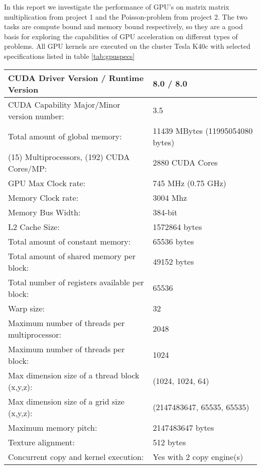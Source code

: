 In this report we investigate the performance of GPU's on matrix matrix multiplication from project 1 and the Poisson-problem from project 2. The two tasks are compute bound and memory bound respectively, so they are a good basis for exploring the capabilities of GPU acceleration on different types of problems. All GPU kernels are executed on the cluster Tesla K40c with selected specifications listed in table \ref{tab:gpuspecs}

\begin{table}
\begin{tabular}{l|l}
  CUDA Driver Version / Runtime Version        &  8.0 / 8.0\\ \hline
  CUDA Capability Major/Minor version number:  &  3.5\\ \hline
  Total amount of global memory:               &  11439 MBytes (11995054080 bytes)\\ \hline
  (15) Multiprocessors, (192) CUDA Cores/MP:   &  2880 CUDA Cores\\ \hline
  GPU Max Clock rate:                          &  745 MHz (0.75 GHz)\\ \hline
  Memory Clock rate:                           &  3004 Mhz\\ \hline
  Memory Bus Width:                            &  384-bit\\ \hline
  L2 Cache Size:                               &  1572864 bytes\\ \hline
  Total amount of constant memory:             &  65536 bytes\\ \hline
  Total amount of shared memory per block:     &  49152 bytes\\ \hline
  Total number of registers available per block:& 65536\\ \hline
  Warp size:                                   &  32\\ \hline
  Maximum number of threads per multiprocessor:&  2048\\ \hline
  Maximum number of threads per block:         &  1024\\ \hline
  Max dimension size of a thread block (x,y,z):& (1024, 1024, 64)\\ \hline
  Max dimension size of a grid size    (x,y,z):& (2147483647, 65535, 65535)\\ \hline
  Maximum memory pitch:                        &  2147483647 bytes\\ \hline
  Texture alignment:                           &  512 bytes\\ \hline
  Concurrent copy and kernel execution:        &  Yes with 2 copy engine(s)\\ \hline

\end{tabular}
\end{table}
